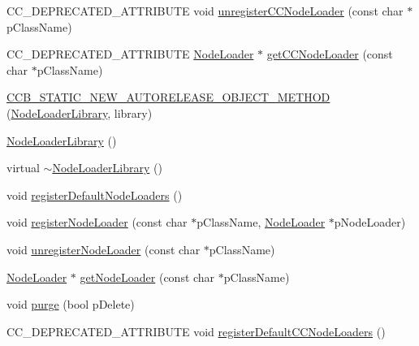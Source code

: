 \begin{DoxyCompactItemize}
\item 
C\+C\+\_\+\+D\+E\+P\+R\+E\+C\+A\+T\+E\+D\+\_\+\+A\+T\+T\+R\+I\+B\+U\+TE void \hyperlink{classcocosbuilder_1_1NodeLoaderLibrary_a8d766eb2ce1a0bab766bb4572215beba}{unregister\+C\+C\+Node\+Loader} (const char $\ast$p\+Class\+Name)
\item 
C\+C\+\_\+\+D\+E\+P\+R\+E\+C\+A\+T\+E\+D\+\_\+\+A\+T\+T\+R\+I\+B\+U\+TE \hyperlink{classcocosbuilder_1_1NodeLoader}{Node\+Loader} $\ast$ \hyperlink{classcocosbuilder_1_1NodeLoaderLibrary_aff326fe273b58b025717fc379efd6bec}{get\+C\+C\+Node\+Loader} (const char $\ast$p\+Class\+Name)
\item 
\hyperlink{classcocosbuilder_1_1NodeLoaderLibrary_aa961f431fa484e1ef7042d3759145ef9}{C\+C\+B\+\_\+\+S\+T\+A\+T\+I\+C\+\_\+\+N\+E\+W\+\_\+\+A\+U\+T\+O\+R\+E\+L\+E\+A\+S\+E\+\_\+\+O\+B\+J\+E\+C\+T\+\_\+\+M\+E\+T\+H\+OD} (\hyperlink{classcocosbuilder_1_1NodeLoaderLibrary}{Node\+Loader\+Library}, library)
\item 
\hyperlink{classcocosbuilder_1_1NodeLoaderLibrary_a18731618610d1221e83013b352c271a9}{Node\+Loader\+Library} ()
\item 
virtual \hyperlink{classcocosbuilder_1_1NodeLoaderLibrary_ab006e44f6d2254f88e968c4ce802447b}{$\sim$\+Node\+Loader\+Library} ()
\item 
void \hyperlink{classcocosbuilder_1_1NodeLoaderLibrary_a184ce1aaca6719538595f4c1de1bb1f1}{register\+Default\+Node\+Loaders} ()
\item 
void \hyperlink{classcocosbuilder_1_1NodeLoaderLibrary_a00533551fa2421b2ea9d335c9c411ed4}{register\+Node\+Loader} (const char $\ast$p\+Class\+Name, \hyperlink{classcocosbuilder_1_1NodeLoader}{Node\+Loader} $\ast$p\+Node\+Loader)
\item 
void \hyperlink{classcocosbuilder_1_1NodeLoaderLibrary_a5439bef5ff6d008c89f1fc8c5300b701}{unregister\+Node\+Loader} (const char $\ast$p\+Class\+Name)
\item 
\hyperlink{classcocosbuilder_1_1NodeLoader}{Node\+Loader} $\ast$ \hyperlink{classcocosbuilder_1_1NodeLoaderLibrary_a18650b5ea32ea7749ed4a35d58be1494}{get\+Node\+Loader} (const char $\ast$p\+Class\+Name)
\item 
void \hyperlink{classcocosbuilder_1_1NodeLoaderLibrary_a2957be41c81e744356bf79275e825663}{purge} (bool p\+Delete)
\item 
C\+C\+\_\+\+D\+E\+P\+R\+E\+C\+A\+T\+E\+D\+\_\+\+A\+T\+T\+R\+I\+B\+U\+TE void \hyperlink{classcocosbuilder_1_1NodeLoaderLibrary_acaa7e8d1a3de9d2d6fc823053ba6a972}{register\+Default\+C\+C\+Node\+Loaders} ()
\item 

\end{DoxyCompactItemize}
